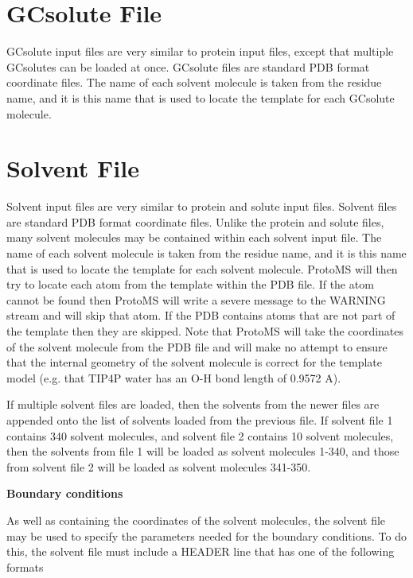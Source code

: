\documentclass[letterpaper,10pt,english]{manual}
\begin{document}
\section{GCsolute File}

GCsolute input files are very similar to protein input files, except that multiple GCsolutes can be loaded at once. GCsolute files are standard PDB format coordinate files. The name of each solvent molecule is taken from the residue name, and it is this name that is used to locate the template for each GCsolute molecule.
\hypertarget{solventpdb}{}

\section{Solvent File}

Solvent input files are very similar to protein and solute input files. Solvent files are standard PDB format coordinate files. Unlike the protein and solute files, many solvent molecules may be contained within each solvent input file. The name of each solvent molecule is taken from the residue name, and it is this name that is used to locate the template for each solvent molecule. ProtoMS will then try to locate each atom from the template within the PDB file. If the atom cannot be found then ProtoMS will write a severe message to the WARNING stream and will skip that atom. If the PDB contains atoms that are not part of the template then they are skipped. Note that ProtoMS will take the coordinates of the solvent molecule from the PDB file and will make no attempt to ensure that the internal geometry of the solvent molecule is correct for the template model (e.g. that
TIP4P water has an O-H bond length of 0.9572 A).

If multiple solvent files are loaded, then the solvents from the newer files are appended onto the list of solvents loaded from the previous file. If solvent file 1 contains 340 solvent molecules, and solvent file 2 contains 10 solvent molecules, then the solvents from file 1 will be loaded as solvent molecules 1-340, and those from solvent file 2 will be loaded as solvent molecules 341-350.

\textbf{Boundary conditions}

As well as containing the coordinates of the solvent molecules, the solvent file may be used to specify the parameters needed for the boundary conditions. To do this, the solvent file must include a HEADER line that has one of the following formats
\end{document}
